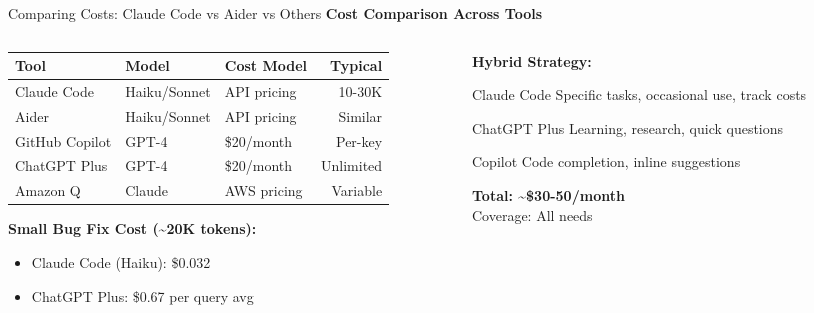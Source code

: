 \documentclass[aspectratio=169,11pt]{beamer}
\begin{document}
\begin{frame}{Comparing Costs: Claude Code vs Aider vs Others}
    \textbf{Cost Comparison Across Tools}

    \begin{columns}[T]
        \begin{column}{0.55\textwidth}
            \begin{tabular}{lllr}
                \toprule
                Tool & Model & Cost Model & Typical\\
                \midrule
                Claude Code & Haiku/Sonnet & API pricing & 10-30K\\
                Aider & Haiku/Sonnet & API pricing & Similar\\
                GitHub Copilot & GPT-4 & \$20/month & Per-key\\
                ChatGPT Plus & GPT-4 & \$20/month & Unlimited\\
                Amazon Q & Claude & AWS pricing & Variable\\
                \bottomrule
            \end{tabular}

            \vspace{0.3cm}
            \textbf{Small Bug Fix Cost (\textasciitilde20K tokens):}
            \begin{itemize}
                \item Claude Code (Haiku): \$0.032
                \item ChatGPT Plus: \$0.67 per query avg
            \end{itemize}
        \end{column}
        \begin{column}{0.42\textwidth}
            \textbf{Hybrid Strategy:}

            \begin{block}{Claude Code}
                Specific tasks, occasional use, track costs
            \end{block}

            \begin{block}{ChatGPT Plus}
                Learning, research, quick questions
            \end{block}

            \begin{block}{Copilot}
                Code completion, inline suggestions
            \end{block}

            \textbf{Total: \textasciitilde\$30-50/month}\\
            Coverage: All needs
        \end{column}
    \end{columns}
\end{frame}
\end{document}

